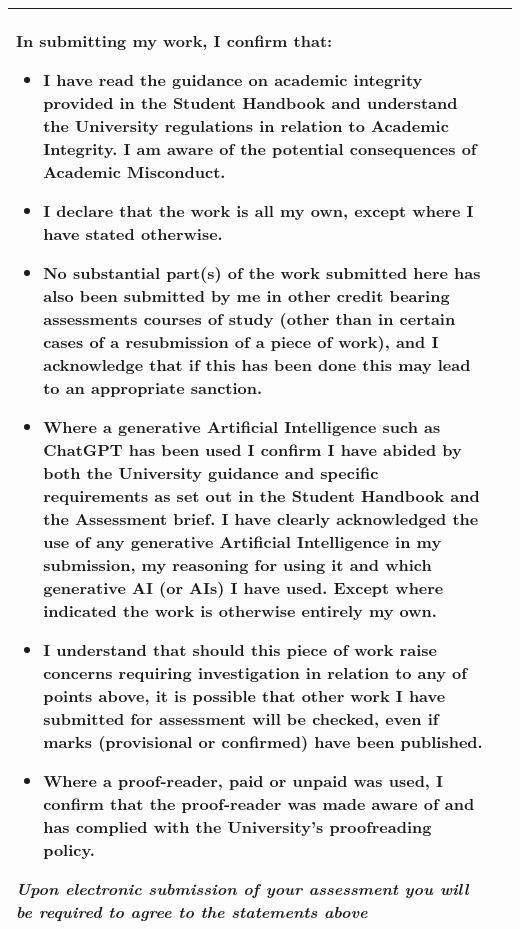 \begin{titlepage}
{\begin{table}[H]
\begin{tabular}{|p{7cm}|p{7cm}|}
{\begin{footnotesize}
    In submitting my work, I confirm that:
    \begin{itemize}[leftmargin=1.5em]
        \item I have read the guidance on academic integrity provided in the Student Handbook and understand the University regulations in relation to Academic Integrity. I am aware of the potential consequences of Academic Misconduct.
        \item I declare that the work is all my own, except where I have stated otherwise.
        \item No substantial part(s) of the work submitted here has also been submitted by me in other credit bearing assessments courses of study (other than in certain cases of a resubmission of a piece of work), and I acknowledge that if this has been done this may lead to an appropriate sanction.
        \item Where a generative Artificial Intelligence such as ChatGPT has been used I confirm I have abided by both the University guidance and specific requirements as set out in the Student Handbook and the Assessment brief. I have clearly acknowledged the use of any generative Artificial Intelligence in my submission, my reasoning for using it and which generative AI (or AIs) I have used. Except where indicated the work is otherwise entirely my own.
        \item I understand that should this piece of work raise concerns requiring investigation in relation to any of points above, it is possible that other work I have submitted for assessment will be checked, even if marks (provisional or confirmed) have been published.
        \item Where a proof-reader, paid or unpaid was used, I confirm that the proof-reader was made aware of and has complied with the University's proofreading policy.
    \end{itemize} 
    \vspace{1em}
        \textbf{\textit{Upon electronic submission of your assessment you will be required to agree to the statements above}}
    \end{footnotesize} 
    } \\ \hline
    
    \end{tabular}
    
\end{table}

}

\end{titlepage}

